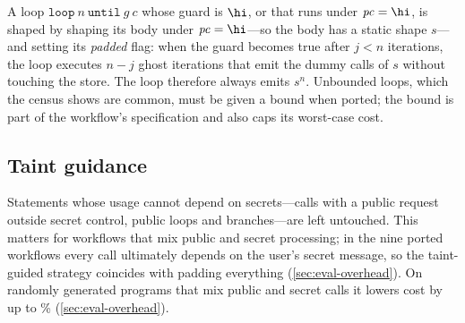 A loop $\texttt{loop}\ n\ \texttt{until}\ g\ c$ whose guard is $\hi$, or that runs under $\mathit{pc}=\hi$, is shaped by shaping its body under $\mathit{pc}=\hi$---so the body has a static shape $s$---and setting its \emph{padded} flag: when the guard becomes true after $j < n$ iterations, the loop executes $n-j$ ghost iterations that emit the dummy calls of $s$ without touching the store. The loop therefore always emits $s^n$. Unbounded loops, which the census shows are common, must be given a bound when ported; the bound is part of the workflow's specification and also caps its worst-case cost.

\subsection{Taint guidance}

Statements whose usage cannot depend on secrets---calls with a public request outside secret control, public loops and branches---are left untouched. This matters for workflows that mix public and secret processing; in the nine ported workflows every call ultimately depends on the user's secret message, so the taint-guided strategy coincides with padding everything (\cref{sec:eval-overhead}). On randomly generated programs that mix public and secret calls it lowers cost by up to \diffTaintSavingMax\% (\cref{sec:eval-overhead}).
